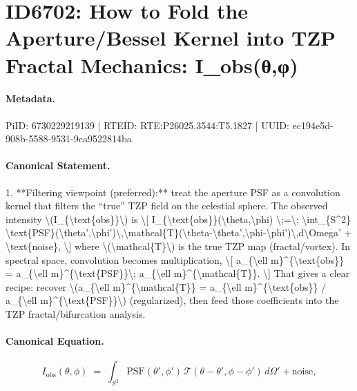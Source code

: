 \section*{ID6702: How to Fold the Aperture/Bessel Kernel into TZP Fractal Mechanics: I\_obs(θ,φ)}
\paragraph{Metadata.}
PiID: 6730229219139 | RTEID: RTE:P26025.3544:T5.1827 | UUID: ec194e5d-908b-5588-9531-9ca9522814ba

\paragraph{Canonical Statement.}
1. **Filtering viewpoint (preferred):** treat the aperture PSF as a convolution kernel that filters the “true” TZP field on the celestial sphere. The observed intensity \textbackslash{}(I\_\{\textbackslash{}text\{obs\}\}\textbackslash{}) is \textbackslash{}[ I\_\{\textbackslash{}text\{obs\}\}(\textbackslash{}theta,\textbackslash{}phi) \textbackslash{};=\textbackslash{}; \textbackslash{}int\_\{S\textasciicircum{}2\} \textbackslash{}text\{PSF\}(\textbackslash{}theta',\textbackslash{}phi')\textbackslash{},\textbackslash{}mathcal\{T\}(\textbackslash{}theta-\textbackslash{}theta',\textbackslash{}phi-\textbackslash{}phi')\textbackslash{},d\textbackslash{}Omega' + \textbackslash{}text\{noise\}, \textbackslash{}] where \textbackslash{}(\textbackslash{}mathcal\{T\}\textbackslash{}) is the true TZP map (fractal/vortex). In spectral space, convolution becomes multiplication, \textbackslash{}[ a\_\{\textbackslash{}ell m\}\textasciicircum{}\{\textbackslash{}text\{obs\}\} = a\_\{\textbackslash{}ell m\}\textasciicircum{}\{\textbackslash{}text\{PSF\}\}\textbackslash{}; a\_\{\textbackslash{}ell m\}\textasciicircum{}\{\textbackslash{}mathcal\{T\}\}. \textbackslash{}] That gives a clear recipe: recover \textbackslash{}(a\_\{\textbackslash{}ell m\}\textasciicircum{}\{\textbackslash{}mathcal\{T\}\} = a\_\{\textbackslash{}ell m\}\textasciicircum{}\{\textbackslash{}text\{obs\}\} / a\_\{\textbackslash{}ell m\}\textasciicircum{}\{\textbackslash{}text\{PSF\}\}\textbackslash{}) (regularized), then feed those coefficients into the TZP fractal/bifurcation analysis.

\paragraph{Canonical Equation.}
\[
I_{\text{obs}}(\theta,\phi) \;=\; \int_{S^2} \text{PSF}(\theta',\phi')\,\mathcal{T}(\theta-\theta',\phi-\phi')\,d\Omega' + \text{noise},
\]

